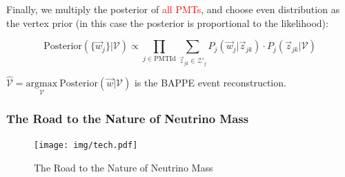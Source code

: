 \documentclass{beamer}
\begin{document}
\begin{CJK*}{UTF8}{gbsn}
\begin{frame}
    Finally, we multiply the posterior of \textcolor{red}{all PMTs}, and choose even distribution as the vertex prior (in this case the posterior is proportional to the likelihood):

    \begin{equation}
        \mathrm{Posterior}(\{\vec{w}_j\}|\mathcal{V}) \propto \prod_{j \in {\mathrm{PMTId}}} \sum_{\vec{z}_{jk} \in \mathcal{Z}'_j} P_j(\vec{w}_j|\vec{z}_{jk}) \cdot P_j(\vec{z}_{jk}|\mathcal{V})
        \label{eq:4}
    \end{equation}

    $\hat{\mathcal{V}}=\underset{\mathcal{V}}{\mathrm{argmax}}\ \mathrm{Posterior}(\vec{w}|\mathcal{V})$ is the BAPPE event reconstruction. 
\end{frame}

\begin{frame}
    \frametitle{The Road to the Nature of Neutrino Mass}
    
    \begin{figure}[H]
        \centering
            \texttt{[image: img/tech.pdf]}
        \caption{The Road to the Nature of Neutrino Mass}
    \end{figure}
\end{frame}


\begin{frame}


\end{frame}
\end{CJK*}
\end{document}
